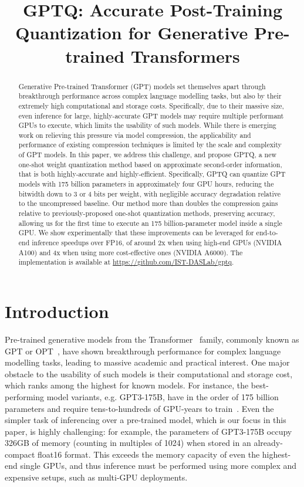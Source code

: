 \title{GPTQ: Accurate Post-Training Quantization for Generative Pre-trained Transformers}

\begin{abstract}
Generative Pre-trained Transformer (GPT) models set themselves apart through breakthrough performance across  complex language modelling tasks, but also by their extremely high computational and storage costs. Specifically, due to their massive size, even inference for large, highly-accurate GPT models may require multiple performant GPUs to execute, which limits the usability of such models. While there is emerging work on relieving this pressure via model compression, the applicability and performance of existing compression techniques is limited by the scale and complexity of GPT models. In this paper, we address this challenge, and propose GPTQ, a new one-shot weight quantization method based on approximate second-order information, that is both highly-accurate and highly-efficient. Specifically, GPTQ can quantize GPT models with 175 billion parameters in approximately four GPU hours, reducing the bitwidth down to 3 or 4 bits per weight, with negligible accuracy degradation relative to the uncompressed baseline. Our method more than doubles the compression gains relative to previously-proposed one-shot quantization methods, preserving accuracy, allowing us for the first time to execute an 175 billion-parameter model inside a single GPU. We show experimentally that these improvements can be leveraged for end-to-end inference speedups over FP16, of around 2x when using high-end GPUs (NVIDIA A100) and 4x when using more cost-effective ones (NVIDIA A6000). The implementation is available at \url{https://github.com/IST-DASLab/gptq}.
\end{abstract}

\section{Introduction}

Pre-trained generative models from the Transformer~\cite{vaswani2017attention} family, commonly known as GPT or OPT~\cite{radford2019language, brown2020language, zhang2022opt}, have shown breakthrough performance for complex language modelling tasks, leading to massive academic and practical interest. One major obstacle to the usability of such models is their computational and storage cost, which ranks among the highest for known models. For instance, the best-performing model variants, e.g. GPT3-175B, have in the order of 175 billion parameters and require tens-to-hundreds of GPU-years to train~\cite{zhang2022opt}. Even the simpler task of inferencing over a pre-trained model, which is our focus in this paper, is highly challenging: for example, the parameters of GPT3-175B occupy 326GB of memory (counting in multiples of 1024) when stored in an already-compact float16 format. This exceeds the memory capacity of even the highest-end single GPUs, and thus inference must be performed using more complex and expensive setups, such as multi-GPU deployments. 

